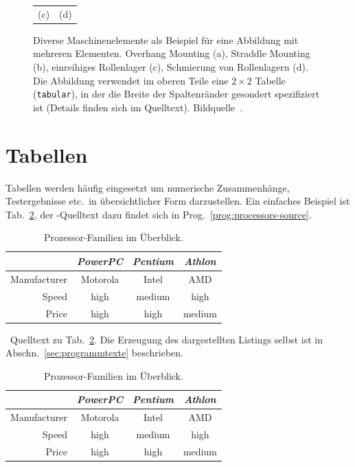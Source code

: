 \begin{figure}
\begin{tabular}{c@{\hspace{12mm}}c}
  (c) & (d)
\end{tabular}
%
\caption{Diverse Maschinenelemente als Beispiel für eine
Abbildung mit mehreren Elementen.
Overhang Mounting (a), Straddle Mounting (b),
einreihiges Rollenlager (c), Schmierung von Rollenlagern (d).
Die Abbildung verwendet im oberen Teile eine $2 \times 2$
Tabelle (\texttt{tabular}), in der die Breite der Spaltenränder 
gesondert spezifiziert ist (Details finden sich im Quelltext).
Bildquelle~\cite{Faires34}.
}
\label{fig:Bearings}
\end{figure}




\section{Tabellen}

Tabellen werden häufig eingesetzt um numerische Zusammenhänge, Testergebnisse
etc.\ in übersichtlicher Form darzustellen.
Ein einfaches Beispiel ist Tab.~\ref{tab:processors}, der \latex-Quelltext dazu
findet sich in Prog.~\ref{prog:processors-source}.


\begin{table}
\caption{Prozessor-Familien im Überblick.}
\label{tab:processors}
\centering
\setlength{\tabcolsep}{5mm}	%
\def\arraystretch{1.25}			%
\begin{tabular}{|r||c|c|c|} \hline
& \emph{PowerPC} & \emph{Pentium} & \emph{Athlon} \\
\hline\hline
Manufacturer & Motorola & Intel & AMD \\
\hline
Speed & high & medium & high   \\
\hline
Price & high & high   & medium \\
\hline
\end{tabular}
\end{table}

\begin{program}
\caption{\latex\ Quelltext zu Tab.~\ref{tab:processors}.
Die Erzeugung des dargestellten Listings selbst ist in Abschn.\ \ref{sec:programmtexte} beschrieben.}
\label{prog:processors-source}
%
\begin{LaTeXCode}[numbers=none]
\begin{table}
	\caption{Prozessor-Familien im Überblick.}
	\label{tab:processors}
	\centering
	\setlength{\tabcolsep}{5mm}	%
	\def\arraystretch{1.25}		%
	\begin{tabular}{|r||c|c|c|} 
		\hline
		& \emph{PowerPC} & \emph{Pentium} & \emph{Athlon} \\
		\hline
		\hline
		Manufacturer & Motorola & Intel & AMD \\
		\hline
		Speed & high & medium & high   \\
		\hline
		Price & high & high   & medium \\
		\hline
	\end{tabular}
\end{table}
\end{LaTeXCode}
%
\end{program}

